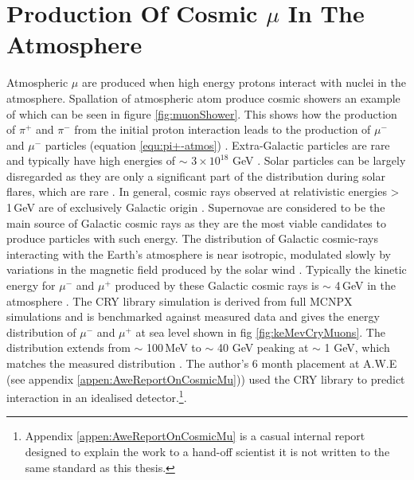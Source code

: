 \section{Production Of Cosmic $\mu$ In The Atmosphere} 
Atmospheric $\mu$ are produced when high energy protons interact with nuclei in the atmosphere\cite{griffiths2008neutrinoOscillations}. Spallation of atmospheric atom produce cosmic showers an example of which  can be seen in figure \ref{fig:muonShower}. This shows how the production of $\pi^+$ and $\pi^-$ from the initial proton interaction leads to the production of $\mu^-$ and $\mu^-$ particles (equation \ref{equ:pi+-atmos}) \cite{griffiths2008neutrinoOscillations}. Extra-Galactic particles are rare and typically have high energies of $\sim$ $3 \times 10^{18}$ GeV \cite{Drury2012OCosmicRays} \cite{ieee_cry_2007}. Solar particles can be largely disregarded as they are only a significant part of the distribution during solar flares, which are rare \cite{Zyla_pdg_2020} \cite{ieee_cry_2007}. In general, cosmic rays observed at  relativistic energies > 1\,GeV are of exclusively Galactic origin \cite{Drury2012OCosmicRays}. Supernovae are considered to be the main source of Galactic cosmic rays as they are the most viable candidates to produce particles with such energy\cite{Drury2012OCosmicRays}. The distribution of Galactic cosmic-rays interacting with the Earth's atmosphere is near isotropic, modulated slowly by variations in the magnetic field produced by the solar wind \cite{Zyla_pdg_2020}. Typically the kinetic energy for $\mu^-$ and $\mu^+$ produced by these Galactic cosmic rays is $\sim$ 4\,GeV in the atmosphere \cite{Zyla_pdg_2020} \cite{MuonPhysics}. The CRY library simulation is derived from full MCNPX simulations and is benchmarked against measured data and gives the energy distribution of $\mu^-$ and $\mu^+$ at sea level shown in fig \ref{fig:keMevCryMuons}. The distribution extends from $\sim$ 100\,MeV to $\sim$ 40 GeV peaking at $\sim$ 1 GeV, which matches the measured distribution \cite{ieee_cry_2007} \cite{Zyla_pdg_2020}. The author’s 6 month placement at A.W.E (see appendix \ref{appen:AweReportOnCosmicMu})) used the CRY library to predict interaction in an idealised detector.\footnote{Appendix \ref{appen:AweReportOnCosmicMu} is a casual internal report designed to explain the work to a hand-off scientist it is not written to the same standard as this thesis.}.

